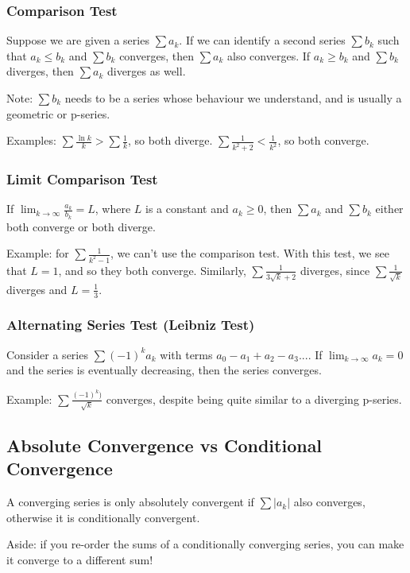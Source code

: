 \documentclass[12pt]{article}
\begin{document}
\subsubsection*{Comparison Test}
Suppose we are given a series $\sum a_k$. If we can identify a second series $\sum b_k$ such that $a_k \leq b_k$ and $\sum b_k$ converges, then $\sum a_k$ also converges. If $a_k \geq b_k$ and $\sum b_k$ diverges, then $\sum a_k$ diverges as well.

Note: $\sum b_k$ needs to be a series whose behaviour we understand, and is usually a geometric or p-series.

Examples: $\sum \frac{\ln k}{k} > \sum \frac{1}{k}$, so both diverge. $\sum \frac{1}{k^2 + 2} < \frac{1}{k^2}$, so both converge.

\subsubsection*{Limit Comparison Test}
If $\displaystyle\lim_{k\to\infty} \frac{a_k}{b_k} = L$, where $L$ is a constant and $a_k \geq 0$, then $\sum a_k$ and $\sum b_k$ either both converge or both diverge.

Example: for $\sum \frac{1}{k^2 - 1}$, we can't use the comparison test. With this test, we see that $L = 1$, and so they both converge. Similarly, $\sum \frac{1}{3\sqrt{k}+2}$ diverges, since $\sum \frac{1}{\sqrt{k}}$ diverges and $L = \frac{1}{3}$.

\subsubsection*{Alternating Series Test (Leibniz Test)}
Consider a series $\sum (-1)^k a_k$ with terms $a_0 - a_1 + a_2 - a_3 ...$. If $\displaystyle\lim_{k\to\infty} a_k = 0$ and the series is eventually decreasing, then the series converges.

Example: $\sum \frac{(-1)^k)}{\sqrt{k}}$ converges, despite being quite similar to a diverging p-series.

\subsection*{Absolute Convergence vs Conditional Convergence}
A converging series is only absolutely convergent if $\sum |a_k|$ also converges, otherwise it is conditionally convergent.

Aside: if you re-order the sums of a conditionally converging series, you can make it converge to a different sum!
\end{document}
